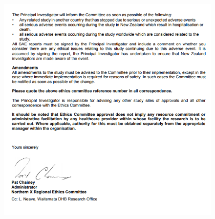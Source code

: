 \begin{figure}
	\centering
	\includegraphics[width=\linewidth]{fig/ethicalapproval/approval2.PNG}
\end{figure}




